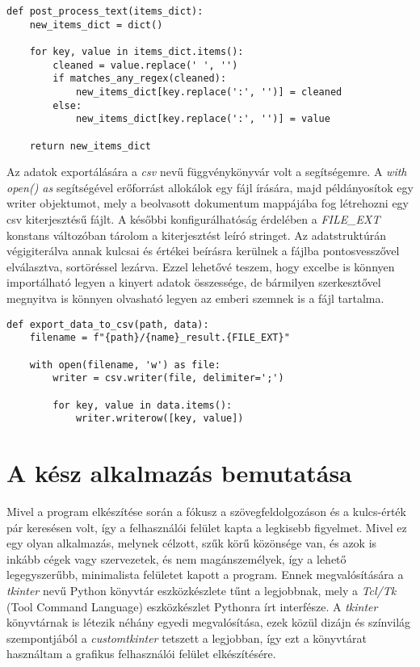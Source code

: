 \documentclass[12pt]{report}
\begin{document}
\begin{verbatim}
def post_process_text(items_dict):
    new_items_dict = dict()

    for key, value in items_dict.items():
        cleaned = value.replace(' ', '')
        if matches_any_regex(cleaned):
            new_items_dict[key.replace(':', '')] = cleaned
        else:
            new_items_dict[key.replace(':', '')] = value

    return new_items_dict
\end{verbatim}

Az adatok exportálására a \emph{csv} nevű függvénykönyvár volt a segítségemre. A \emph{with open() as} segítségével erőforrást allokálok egy fájl írására, majd példányosítok egy writer objektumot, mely a beolvasott dokumentum mappájába fog létrehozni egy csv kiterjesztésű fájlt. A későbbi konfigurálhatóság érdelében a \emph{FILE\_EXT} konstans változóban tárolom a kiterjesztést leíró stringet. Az adatstruktúrán végigiterálva annak kulcsai és értékei beírásra kerülnek a fájlba pontosvesszővel elválasztva, sortöréssel lezárva. Ezzel lehetővé teszem, hogy excelbe is könnyen importálható legyen a kinyert adatok összessége, de bármilyen szerkesztővel megnyitva is könnyen olvasható legyen az emberi szemnek is a fájl tartalma.

\begin{verbatim}
def export_data_to_csv(path, data):
    filename = f"{path}/{name}_result.{FILE_EXT}"

    with open(filename, 'w') as file:
        writer = csv.writer(file, delimiter=';')

        for key, value in data.items():
            writer.writerow([key, value])
\end{verbatim}

\chapter{A kész alkalmazás bemutatása}

Mivel a program elkészítése során a fókusz a szövegfeldolgozáson és a kulcs-érték pár keresésen volt, így a felhasználói felület kapta a legkisebb figyelmet. Mivel ez egy olyan alkalmazás, melynek célzott, szűk körű közönsége van, és azok is inkább cégek vagy szervezetek, és nem magánszemélyek, így a lehető legegyszerűbb, minimalista felületet kapott a program.
Ennek megvalósítására a \emph{tkinter} nevű Python könyvtár eszközkészlete tűnt a legjobbnak, mely a \emph{Tcl/Tk} (Tool Command Language) \cite{tcl} eszközkészlet Pythonra írt interfésze. A \emph{tkinter} könyvtárnak is létezik néhány egyedi megvalósítása, ezek közül dizájn és színvilág szempontjából a \emph{customtkinter} \cite{customtkinter} tetszett a legjobban, így ezt a könyvtárat használtam a grafikus felhasználói felület elkészítésére.
\end{document}

